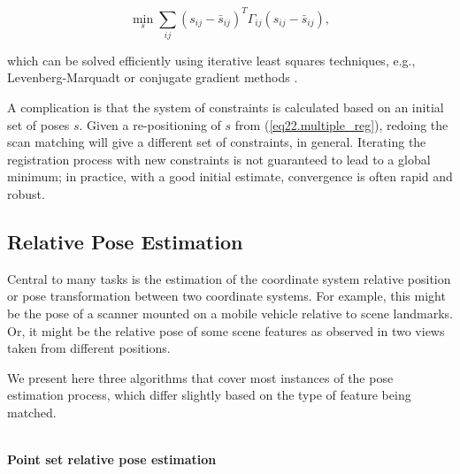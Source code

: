 \documentclass[twocolumn,oneside]{book}
\begin{document}
\begin{equation}
\min_s \sum_{ij} (s_{ij}-\bar{s}_{ij})^T \Gamma_{ij} (s_{ij}-\bar{s}_{ij}),
\label{eq22.multiple_reg}
\end{equation}

\noindent which can be solved efficiently using iterative least
squares techniques, e.g., Levenberg-Marquadt or conjugate gradient
methods \cite{konolige04,kelly03}.

A complication is that the system of constraints is calculated based
on an initial set of poses $s$.  Given a re-positioning of $s$ from
(\ref{eq22.multiple_reg}), redoing the scan matching will give a
different set of constraints, in general.  Iterating the registration
process with new constraints is not guaranteed to lead to a global
minimum; in practice, with a good initial estimate, convergence is
often rapid and robust.


\subsection{Relative Pose Estimation\label{pose23}} 

Central to many tasks is the estimation of the coordinate system
relative position or pose transformation between two coordinate systems.
For example, this might be the pose of a scanner mounted on
a mobile vehicle relative to scene landmarks.
Or, it might be the relative pose of some scene features as observed in
two views taken from different positions.

We present here three algorithms that cover most instances of 
the pose estimation process,
which differ slightly based on the type of feature being matched.

\ \\
\noindent
{\bf Point set relative pose estimation}
\end{document}
